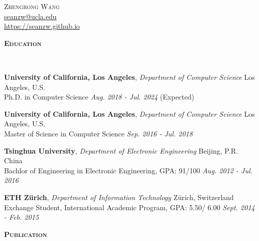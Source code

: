 \documentclass[a4paper]{article}
\newenvironment{changemargin}[2]{%
  \begin{list}{}{%
    \setlength{\topsep}{0pt}%
    \setlength{\leftmargin}{#1}%
    \setlength{\rightmargin}{#2}%
    \setlength{\listparindent}{\parindent}%
    \setlength{\itemindent}{\parindent}%
    \setlength{\parsep}{\parskip}%
  }%
  \item[]}{\end{list}
}
\newcommand{\lineover}{
	\begin{changemargin}{-0.05in}{-0.05in}
		\vspace*{-8pt}
		\hrulefill \\
		\vspace*{-2pt}
	\end{changemargin}
}
\newcommand{\header}[1]{
	\begin{changemargin}{-0.5in}{-0.5in}
		\scshape{\textbf{#1}}\\
  	\lineover
	\end{changemargin}
}
\newcommand{\contact}[3]{
	\begin{changemargin}{-0.5in}{-0.5in}
		\begin{center}
			{\Large \scshape {#1}}\\ \smallskip
			{\href{mailto:#2}{#2}}\\ \smallskip
			{\href{#3}{#3}}\\ \smallskip
		\end{center}
	\end{changemargin}
}
\newenvironment{body} {
	\vspace*{-16pt}
	\begin{changemargin}{-0.25in}{-0.5in}
  }	
	{\end{changemargin}
}
\begin{document}
\contact{Zhengrong Wang}{seanzw@ucla.edu}{https://seanzw.github.io}


\header{Education}

\begin{body}
	\vspace{14pt}

	\textbf{University of California, Los Angeles}, \emph{Department of Computer Science} \hfill Los Angeles, U.S. \\
Ph.D. in Computer Science \hfill \emph{Aug. 2018 - Jul. 2024} (Expected){} \\

\vspace{6pt}

	\textbf{University of California, Los Angeles}, \emph{Department of Computer Science} \hfill Los Angeles, U.S. \\
Master of Science in Computer Science \hfill \emph{Sep. 2016 - Jul. 2018}{} \\

\vspace{6pt}

	\textbf{Tsinghua University}, \emph{Department of Electronic Engineering} \hfill Beijing, P.R. China \\
Bachlor of Engineering in Electronic Engineering, GPA: 91/100 \hfill \emph{Aug. 2012 - Jul. 2016}{} \\
\vspace{6pt}

	\textbf{ETH Z\"urich}, \emph{Department of Information Technology} \hfill Z\"urich, Switzerland \\
	Exchange Student, International Academic Program, GPA: 5.50/ 6.00 \hfill \emph{Sept. 2014 - Feb. 2015}{} \\


\end{body}

\smallskip
\smallskip

\header{Publication}
\end{document}
